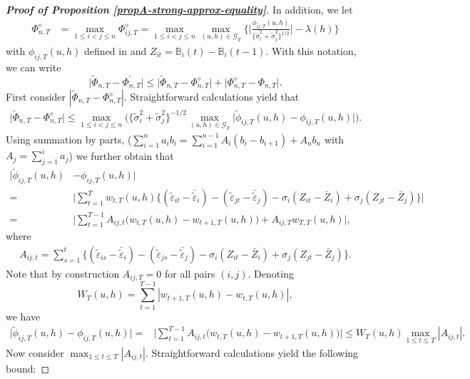 \documentclass[a4paper,12pt]{article}
\makeatletter
\renewcommand{\eqref}[1]{\tagform@{\ref{#1}}}
\newcommand{\gaussianstat}{\Phi^\prime}
\makeatother
\begin{document}
\begin{proof}[\textnormal{\textbf{Proof of Proposition \ref{propA-strong-approx-equality}}}]
In addition, we let
\begin{align*}
\Phi_{n, T}^{\diamond} & =\max_{1\leq i < j \leq n} \Phi_{ij, T}^{\diamond} = \max_{1\leq i< j \leq n}\max_{(u,h) \in \mathcal{G}_T} \Big\{ \Big|\frac{\phi_{ij, T}(u,h)}{\{\widetilde{\sigma}_i^2 + \widetilde{\sigma}_j^2 \}^{1/2}}\Big| - \lambda(h) \Big\} 
\end{align*}
with $\phi_{ij, T}(u,h)$ defined in \eqref{eq-stat-5} and $Z_{it} = \mathbb{B}_i(t) - \mathbb{B}_i(t-1)$. With this notation, we can write 
\begin{equation}\label{eq-strongapprox-bound1}
\big| \widetilde{\Phi}_{n, T} - \gaussianstat_{n, T} \big| \le \big| \widetilde{\Phi}_{n, T} - \Phi_{n, T}^{\diamond} \big| + \big| \Phi_{n, T}^{\diamond} - \Phi_{n, T} \big|. 
\end{equation}
First consider $|\widetilde{\Phi}_{n, T} - \Phi_{n, T}^{\diamond}|$. Straightforward calculations yield that 
\begin{align}\label{eq-strongapprox-bound2}
\big| \widetilde{\Phi}_{n, T} - \Phi_{n, T}^{\diamond} \big| \le  \max_{1\le i < j \le n} \Big(\{\widetilde{\sigma}_i^2 + \widetilde{\sigma}_j^2 \}^{-1/2} \max_{(u,h) \in \mathcal{G}_T} \big| \widetilde{\phi}_{ij, T}(u,h) - \phi_{ij, T}(u,h) \big|\Big).
\end{align}
Using summation by parts,
($\sum_{i=1}^n a_i b_i = \sum_{i=1}^{n-1} A_i (b_i - b_{i+1}) + A_n b_n$ with $A_j = \sum_{j=1}^i a_j$) 
we further obtain that 
\begin{align*}
\big| \widetilde{\phi}_{ij, T}(u,h) &- \phi_{ij, T}(u,h) \big|  \\
=&\bigg|\sum_{t=1}^T w_{t,T}(u,h) \big\{ (\widetilde{\varepsilon}_{it} - \bar{\widetilde{\varepsilon}}_i) - (\widetilde{\varepsilon}_{jt} - \bar{\widetilde{\varepsilon}}_j) -{\sigma}_i (Z_{it} - \bar{Z}_i) + {\sigma}_j (Z_{jt} - \bar{Z}_j) \big\}\bigg|  \\
=&\Big|\sum_{t=1}^{T-1} A_{ij, t} \big(w_{t,T}(u,h) -w_{t+1,T}(u,h)\big) + A_{ij, T} w_{T,T}(u,h)\Big|,
\end{align*}
where 
\begin{align*}
A_{ij, t} = \sum_{s=1}^t \big\{ (\widetilde{\varepsilon}_{is} - \bar{\widetilde{\varepsilon}}_i)  - (\widetilde{\varepsilon}_{js} - \bar{\widetilde{\varepsilon}}_j) -{\sigma}_i (Z_{it} - \bar{Z}_i) + {\sigma}_j (Z_{jt} - \bar{Z}_j) \big\}.
\end{align*}
Note that by construction $A_{ij, T} = 0$ for all pairs $(i, j)$. Denoting 
\[ W_T(u,h) = \sum\limits_{t=1}^{T-1} |w_{t+1,T}(u,h) - w_{t,T}(u,h)|,\]
we have 
\begin{align}\label{eq-strongapprox-bound3}
\big| \widetilde{\phi}_{ij, T}(u,h) - \phi_{ij, T}(u,h) \big| =& \Big|\sum_{t=1}^{T-1} A_{ij, t} \big(w_{t,T}(u,h) -w_{t+1,T}(u,h)\big)\Big|\le W_T(u, h)\max_{1 \le t \le T} |A_{ij, t}|.
\end{align}
Now consider $\max_{1 \le t \le T} |A_{ij, t}|$. Straightforward calculations yield the following bound:


\end{proof}
\end{document}
